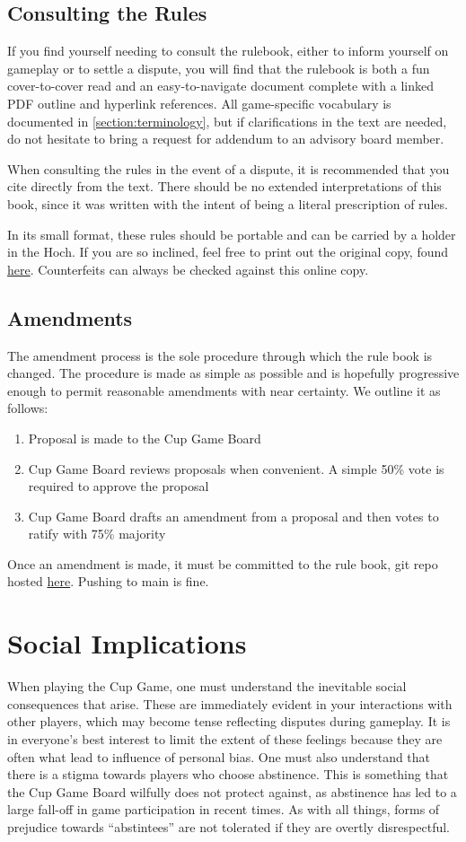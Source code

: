 \documentclass[12pt]{IEEEconf}
\begin{document}
\subsection{Consulting the Rules}
If you find yourself needing to consult the rulebook, either to inform yourself on gameplay or to settle a dispute, you will find that the rulebook is both a fun cover-to-cover read and an easy-to-navigate document complete with a linked PDF outline and hyperlink references. All game-specific vocabulary is documented in \ref{section:terminology}, but if clarifications in the text are needed, do not hesitate to bring a request for addendum to an advisory board member.

When consulting the rules in the event of a dispute, it is recommended that you cite directly from the text. There should be no extended interpretations of this book, since it was written with the intent of being a literal prescription of rules.

In its small format, these rules should be portable and can be carried by a holder in the Hoch. If you are so inclined, feel free to print out the original copy, found \href{https://www.cs.hmc.edu/~hpick/Cupgame%20Rules.pdf}{here}. Counterfeits can always be checked against this online copy.
\subsection{Amendments}
The amendment process is the sole procedure through which the rule book is changed. The procedure is made as simple as possible and is hopefully progressive enough to permit reasonable amendments with near certainty. We outline it as follows:
\begin{enumerate}
    \item Proposal is made to the Cup Game Board
    \item Cup Game Board reviews proposals when convenient. A simple 50\% vote is required to approve the proposal
    \item Cup Game Board drafts an amendment from a proposal and then votes to ratify with 75\% majority
\end{enumerate}
Once an amendment is made, it must be committed to the rule book, git repo hosted \href{https://github.com/henry-2025/Cupgame-Rules}{here}. Pushing to main is fine.
\section{Social Implications}
\label{section:social}
When playing the Cup Game, one must understand the inevitable social consequences that arise. These are immediately evident in your interactions with other players, which may become tense reflecting disputes during gameplay. It is in everyone's best interest to limit the extent of these feelings because they are often what lead to influence of personal bias. One must also understand that there is a stigma towards players who choose abstinence. This is something that the Cup Game Board wilfully does not protect against, as abstinence has led to a large fall-off in game participation in recent times. As with all things, forms of prejudice towards ``abstintees'' are not tolerated if they are overtly disrespectful.
\end{document}
